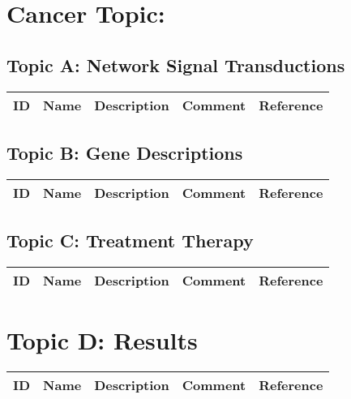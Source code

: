 
\section{Cancer Topic:}

\subsection{Topic A: Network Signal Transductions}

\begin{table}[H]\centering
\begin{tabular}{p{1cm}p{2cm}p{3cm}p{3cm}p{1cm}}
ID & Name & Description & Comment & Reference \\
\hline
\hline
\end{tabular}
\end{table}

\subsection{Topic B: Gene Descriptions}

\begin{table}[H]\centering
\begin{tabular}{p{1cm}p{2cm}p{3cm}p{3cm}p{1cm}}
ID & Name & Description & Comment & Reference \\
\hline
\hline
\end{tabular}
\end{table}

\subsection{Topic C: Treatment Therapy}

\begin{table}[H]\centering
\begin{tabular}{p{1cm}p{2cm}p{3cm}p{3cm}p{1cm}}
ID & Name & Description & Comment & Reference \\
\hline
\hline
\end{tabular}
\end{table}

\section{Topic D: Results}

\begin{table}[H]\centering
\begin{tabular}{p{1cm}p{2cm}p{3cm}p{3cm}p{1cm}}
ID & Name & Description & Comment & Reference \\
\hline
\hline
\end{tabular}
\end{table}

